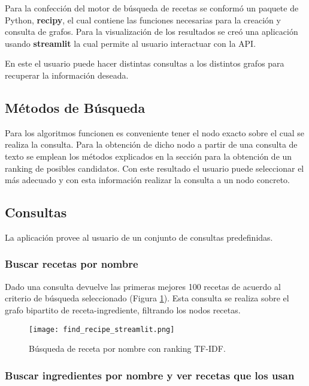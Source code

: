 \documentclass[
	a4paper, %
	10pt, %
	unnumberedsections, %
	twoside, %
]{LTJournalArticle}
\begin{document}
Para la confección del motor de búsqueda de recetas se conformó un paquete de Python, \textbf{recipy}, el cual
contiene las funciones necesarias para la creación y consulta de grafos. Para la visualización de los
resultados se creó una aplicación usando \textbf{streamlit} la cual permite al usuario interactuar con la API.

En este el usuario puede hacer distintas consultas a los distintos grafos para recuperar la información deseada.

\subsection{Métodos de Búsqueda}

Para los algoritmos funcionen es conveniente tener el nodo exacto sobre el cual se realiza la consulta. Para la
obtención de dicho nodo a partir de una consulta de texto se emplean los métodos explicados en la sección 
 para la obtención de un ranking de posibles candidatos. Con este resultado el usuario
puede seleccionar el más adecuado y con esta información realizar la consulta a un nodo concreto.

\subsection{Consultas}

La aplicación provee al usuario de un conjunto de consultas predefinidas.

\subsubsection{Buscar recetas por nombre}

Dado una consulta devuelve las primeras mejores 100 recetas de acuerdo al criterio de búsqueda seleccionado
(Figura \ref{fig:recipe_search_tfidf}).
Esta consulta se realiza sobre el grafo bipartito de receta-ingrediente, filtrando los nodos recetas. 

\begin{figure} %
	\texttt{[image: find\_recipe\_streamlit.png]}
	\caption{Búsqueda de receta por nombre con ranking TF-IDF.}
	\label{fig:recipe_search_tfidf}
\end{figure}

\subsubsection{Buscar ingredientes por nombre y ver recetas que los usan}
\end{document}
